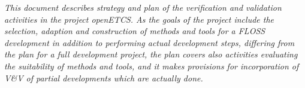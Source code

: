 \documentclass{template/openetcs_report}
\begin{document}
{\it This document describes strategy and plan of the
  verification and validation activities in the project openETCS. As
  the goals of the project include the selection, adaption and
  construction of methods and tools for a FLOSS development in
  addition to performing actual development steps, differing from the
  plan for a full development project, the plan covers also activities
  evaluating the suitability of methods and tools, and it makes
  provisions for incorporation of V\&V of partial developments which
  are actually done.}

\end{document}
